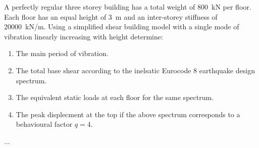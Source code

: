 
\begin{Exercise}[label=three_storey_regular]
A perfectly regular three storey building has a total weight of \SI{800}{kN} per floor. Each floor has an equal height of \SI{3}{m} and an inter-storey stiffness of \SI{20000}{kN/m}. Using a simplified shear building model with a single mode of vibration linearly increasing with height determine:
\begin{enumerate}
    \item The main period of vibration.
    \item The total base shear according to the inelsatic Eurocode 8 earthquake design spectrum.
    \item The equivalent static loads at each floor for the same spectrum.
    \item The peak displecment at the top if the above spectrum corresponds to a behavioural factor $q=4$.
\end{enumerate}

\begin{center}
\end{center}

\shortAnswer ...
\end{Exercise}




